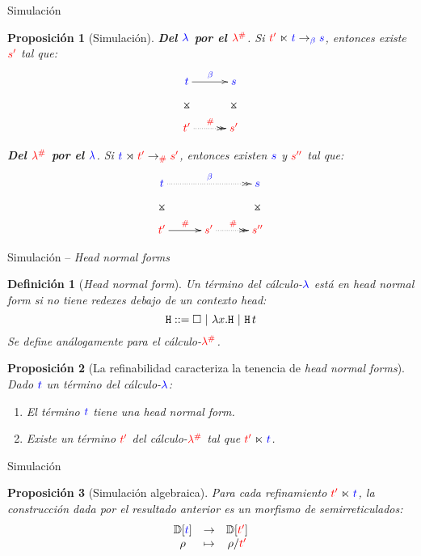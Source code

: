 \documentclass{beamer}
\newtheorem{defes}{Definición}
\newtheorem{proes}{Proposición}
\newcommand{\cLam}[1]{{\color{darkBlue} #1}}
\newcommand{\cDist}[1]{{\color{red} #1}}
\newcommand{\clambdadist}{\cDist{\lambdadist}}
\newcommand{\clambda}{\cLam{\lambda}}
\begin{document}
\begin{frame}{Simulación}
\begin{proes}[Simulación]
\textbf{Del $\clambda$ por el $\clambdadist$}.
Si $\cDist{\tm'} \refines \cLam{\tm} \to_{\cLam{\beta}} \cLam{\tmtwo}$,
entonces existe $\cDist{\tmtwo'}$ tal que:
\[
\xymatrix@=1cm{
 \cLam{\tm} \ar@{}[d]|*=0[@]{\rtimes} \ar[r]^{\cLam{\beta}} & \cLam{\tmtwo} \ar@{}[d]|*=0[@]{\rtimes} \\
 \cDist{\tm'} \ar@{.>>}[r]^{\cDist{\dist}} & \cDist{\tmtwo'} \\
}
\]

\textbf{Del $\clambdadist$ por el $\clambda$}.
Si $\cLam{\tm} \refinedby \cDist{\tm'} \to_{\cDist{\dist}} \cDist{\tmtwo'}$,
entonces existen $\cLam{\tmtwo}$ y $\cDist{\tmtwo''}$ tal que:
\[
\xymatrix@=1cm{
 \cLam{\tm} \ar@{}[d]|*=0[@]{\rtimes} \ar@{.>>}[rr]^{\cLam{\beta}} & & \cLam{\tmtwo} \ar@{}[d]|*=0[@]{\rtimes} \\
 \cDist{\tm'} \ar[r]^{\cDist{\dist}} & \cDist{\tmtwo'} \ar@{.>>}[r]^{\cDist{\dist}} & \cDist{\tmtwo''} \\
}
\]
\end{proes}
\end{frame}

\begin{frame}{Simulación -- \emph{Head normal forms}}
\begin{defes}[\emph{Head normal form}]
Un término del cálculo-$\clambda$ está en \emph{head normal form} si no tiene redexes debajo de un contexto head:
\[ \mathtt{H} ::= \Box \ | \ \lambda x. \mathtt{H} \ | \ \mathtt{H}\, t \]
Se define análogamente para el cálculo-$\clambdadist$.
\end{defes}

\begin{proes}[{\footnotesize La refinabilidad caracteriza la tenencia de \emph{head normal forms}}]
Dado $\cLam{t}$ un término del cálculo-$\clambda$:
\begin{enumerate}
\item El término $\cLam{t}$ tiene una \emph{head normal form}.
\item Existe un término $\cDist{t'}$ del cálculo-$\clambdadist$ tal que $\cDist{t'} \refines \cLam{t}$.
\end{enumerate}
\end{proes}
\end{frame}

\begin{frame}{Simulación}
\begin{proes}[Simulación algebraica]
Para cada refinamiento $\cDist{t'} \refines \cLam{t}$, la construcción dada por el resultado
anterior es un morfismo de semirreticulados:
\[
\begin{array}{ccc}
  \ulbDeriv{\cLam{t}} & \to & \ulbDeriv{\cDist{t'}} \\
  \rho & \mapsto & \rho / \cDist{t'} \\
\end{array}
\]
\end{proes}
\end{frame}
\end{document}
